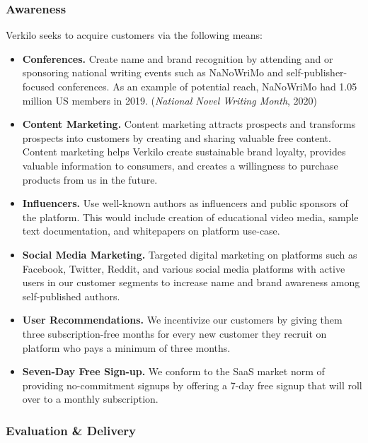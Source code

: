 \documentclass[11pt,openany]{book}
\providecommand{\tightlist}{%
  \setlength{\itemsep}{0pt}\setlength{\parskip}{0pt}}
\begin{document}
\hypertarget{awareness}{%
\subsubsection{Awareness}\label{awareness}}

Verkilo seeks to acquire customers via the following means:

\begin{itemize}
\tightlist
\item
  \textbf{Conferences.} Create name and brand recognition by attending
  and or sponsoring national writing events such as NaNoWriMo and
  self-publisher-focused conferences. As an example of potential reach,
  NaNoWriMo had 1.05 million US members in 2019. (\emph{National Novel
  Writing Month}, 2020)
\item
  \textbf{Content Marketing.} Content marketing attracts prospects and
  transforms prospects into customers by creating and sharing valuable
  free content. Content marketing helps Verkilo create sustainable brand
  loyalty, provides valuable information to consumers, and creates a
  willingness to purchase products from us in the future.
\item
  \textbf{Influencers.} Use well-known authors as influencers and public
  sponsors of the platform. This would include creation of educational
  video media, sample text documentation, and whitepapers on platform
  use-case.
\item
  \textbf{Social Media Marketing.} Targeted digital marketing on
  platforms such as Facebook, Twitter, Reddit, and various social media
  platforms with active users in our customer segments to increase name
  and brand awareness among self-published authors.
\item
  \textbf{User Recommendations.} We incentivize our customers by giving
  them three subscription-free months for every new customer they
  recruit on platform who pays a minimum of three months.
\item
  \textbf{Seven-Day Free Sign-up.} We conform to the SaaS market norm of
  providing no-commitment signups by offering a 7-day free signup that
  will roll over to a monthly subscription.
\end{itemize}

\hypertarget{evaluation-delivery}{%
\subsubsection{Evaluation \& Delivery}\label{evaluation-delivery}}
\end{document}
